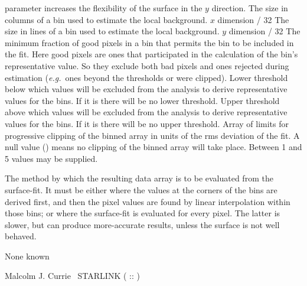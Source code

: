 {\begin{manroutinedescription}
\begin{manparametertable}
  parameter increases the flexibility of the surface in the {$y$}
  direction. {\mantt{[4]}}
  The size in columns of a bin used to estimate the local background.
  {\mantt{[}}{$x$} dimension / 32 {\mantt{]}}
  The size in lines of a bin used to estimate the local background.
  {\mantt{[}}{$y$} dimension / 32 {\mantt{]}}
  The minimum fraction of good pixels in a bin that permits
  the bin to be included in the fit.  Here good pixels are
  ones that participated in the calculation of the bin's
  representative value. So they exclude both bad pixels and
  ones rejected during estimation ({\it e.g.}\ ones beyond the
  thresholds or were clipped). {\mantt{[0.3]}}
  Lower threshold below which values will be excluded from the
  analysis to derive representative values for the bins.  If
  it is {\mantt{!}} there will be no lower threshold. {\mantt{[!]}} 
  Upper threshold above which values will be excluded from the
  analysis to derive representative values for the bins.  If
  it is {\mantt{!}} there will be no upper threshold. {\mantt{[!]}} 
  Array of limits for progressive clipping of the binned array
  in units of the rms deviation of the fit.  A null value ({\mantt{!}})
  means no clipping of the binned array will take place.
  Between 1 and 5 values may be supplied. {\mantt{[!]}} 
\end{manparametertable}
\begin{manparametertable}
  The method by which the resulting data array is to be
  evaluated from the surface-fit.  It must be either
  {} where the values at the corners of the bins
  are derived first, and then the pixel values are found by
  linear interpolation within those bins; or {} where the
  surface-fit is evaluated for every pixel.  The latter is
  slower, but can produce more-accurate results, unless the
  surface is not well behaved. {\mantt{['INTERPOLATE']}} 
\end{manparametertable}
  None known

  Malcolm J. Currie ~STARLINK ( {}::{} )


\end{manroutinedescription}}
